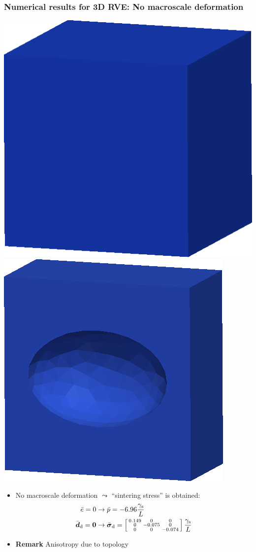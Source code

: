 \documentclass[11pt]{beamer} %
\renewcommand{\dev}{\mathrm{d}}
\newcommand{\surf}{\mathrm{s}}
\begin{document}
\begin{frame}
 \frametitle{Numerical results for 3D RVE: No macroscale deformation}
\begin{center}
 \includegraphics[height=0.3\linewidth]{figures/RVEAniso}
\hspace{1cm}
 \includegraphics[height=0.3\linewidth]{figures/RVEAnisoCut}
\end{center}
 \begin{itemize}
  \item No macroscale deformation $\leadsto$ ``sintering stress'' is obtained:
  \begin{align*}
   \bar{e} = 0 &\rightarrow \bar{p} = -6.96 \frac{\gamma_\surf}{L}
\\
   \bar{\ts d}_\dev = \ts 0 &\rightarrow \bar{\ts\sigma}_\dev = \left[\begin{smallmatrix} 0.149 & 0 & 0 \\ 0 & -0.075 & 0 \\ 0 & 0 & -0.074 \end{smallmatrix}\right]\frac{\gamma_\surf}{L}
  \end{align*}
 \item \textbf{Remark} Anisotropy due to topology
 \end{itemize}
\end{frame}
\end{document}
